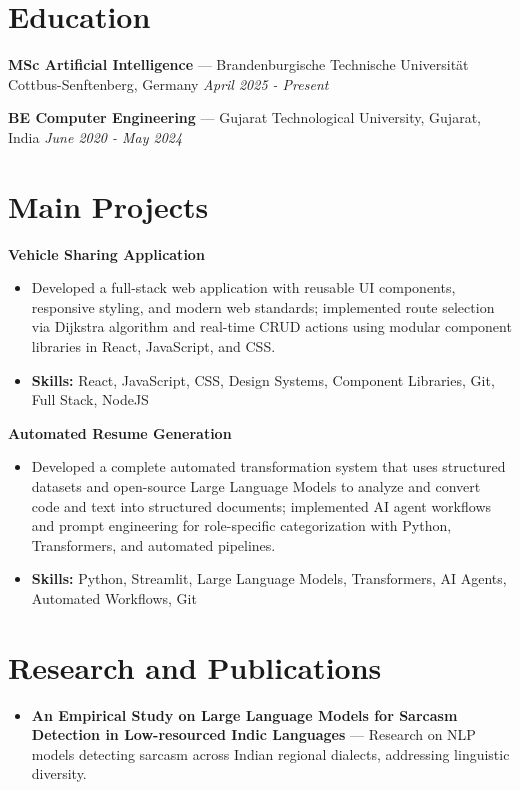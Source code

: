 \documentclass[a4paper,10pt]{article}
\begin{document}
\section*{Education}
\textbf{MSc Artificial Intelligence} — Brandenburgische Technische Universität Cottbus-Senftenberg, Germany \hfill \textit{April 2025 - Present}\par
\vspace{1.5pt}
\textbf{BE Computer Engineering} — Gujarat Technological University, Gujarat, India \hfill \textit{June 2020 - May 2024}\par

\section*{Main Projects}
\textbf{Vehicle Sharing Application}\par
\vspace{1pt}
\begin{itemize}
  \item Developed a full-stack web application with reusable UI components, responsive styling, and modern web standards; implemented route selection via Dijkstra algorithm and real-time CRUD actions using modular component libraries in React, JavaScript, and CSS.
  \item \textbf{Skills:} React, JavaScript, CSS, Design Systems, Component Libraries, Git, Full Stack, NodeJS
\end{itemize}
\vspace{3pt}
\textbf{Automated Resume Generation}\par
\vspace{1pt}
\begin{itemize}
  \item Developed a complete automated transformation system that uses structured datasets and open-source Large Language Models to analyze and convert code and text into structured documents; implemented AI agent workflows and prompt engineering for role-specific categorization with Python, Transformers, and automated pipelines.
  \item \textbf{Skills:} Python, Streamlit, Large Language Models, Transformers, AI Agents, Automated Workflows, Git
\end{itemize}

\section*{Research and Publications}
\begin{itemize}
\item \textbf{An Empirical Study on Large Language Models for Sarcasm Detection in Low-resourced Indic Languages} — Research on NLP models detecting sarcasm across Indian regional dialects, addressing linguistic diversity.
\end{itemize}
\end{document}
